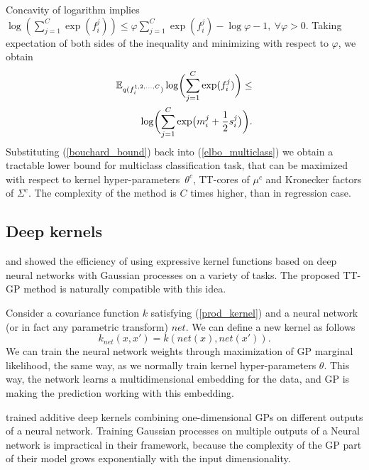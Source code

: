   Concavity of logarithm implies $\log\left(\sum_{j=1}^{C} \exp(f_i^j)\right) \le 
  \varphi \sum_{j=1}^C \exp(f_i^j) - \log \varphi - 1,\ \forall\varphi > 0$. 
  Taking expectation of both sides of the inequality and minimizing with respect
  to $\varphi$, we obtain
  \begin{equation}
  \label{bouchard_bound}
  \begin{split}
    \mathbb{E}_{q(f_i^{1, 2, \ldots, C})} \log\biggl(\sum_{j=1}^C \exp(f_i^j)\biggr) \le
    \\
    \log \biggl(\sum_{j=1}^C \exp\bigl(m_i^j + \frac 1 2 s_i^j\bigr) \biggr).
  \end{split}
  \end{equation}
  Substituting (\ref{bouchard_bound}) back into (\ref{elbo_multiclass}) we obtain
  a tractable lower bound for multiclass classification task, that can be
  maximized with respect to kernel hyper-parameters~$\theta^c$, TT-cores of
  $\mu^c$ and Kronecker factors of $\Sigma^c$. The complexity of the method
  is $C$ times higher, than in regression case.

\subsection{Deep kernels}

  \citet{wilson2016stochastic} and \citet{wilson2016deep} showed the efficiency
  of using expressive kernel functions based on deep neural networks with
  Gaussian processes on a variety of tasks. The proposed TT-GP method is
  naturally compatible with this idea.

  Consider a covariance function $k$ satisfying (\ref{prod_kernel}) and
  a neural network (or in fact any parametric transform) $net$. We can define a
  new kernel as follows
  \[
    k_{net}(x, x') = k(net(x), net(x')).
  \]
  We can train the neural network weights through maximization of GP marginal
  likelihood, the same way, as we normally train kernel hyper-parameters $\theta$.
  This way, the network learns a multidimensional embedding for the data, and
  GP is making the prediction working with this embedding.
  
  \citet{wilson2016stochastic} trained additive deep kernels combining 
  one-dimensional GPs on different outputs of a neural network. Training
  Gaussian processes on multiple outputs of a Neural network is impractical
  in their framework, because the complexity of the GP part of their model
  grows exponentially with the input dimensionality. 

